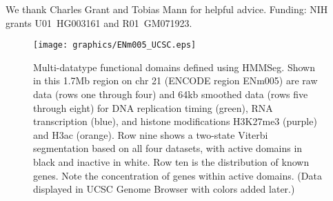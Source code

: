 \documentclass{bioinfo}
\begin{document}
We thank Charles Grant and Tobias Mann for helpful advice. Funding:
NIH grants U01~HG003161 and R01~GM071923.

\begin{figure}
  \centering
  \texttt{[image: graphics/ENm005\_UCSC.eps]}
  \caption{Multi-datatype functional domains defined using HMMSeg.
  Shown in this 1.7Mb region on chr 21 (ENCODE region ENm005) are raw
  data (rows one through four) and 64kb smoothed data (rows five
  through eight) for DNA replication timing (green), RNA transcription
  (blue), and histone modifications H3K27me3 (purple) and H3ac
  (orange).  Row nine shows a two-state Viterbi segmentation based on
  all four datasets, with active domains in black and inactive in
  white. Row ten is the distribution of known genes. Note the
  concentration of genes within active domains. (Data displayed in
  UCSC Genome Browser with colors added later.)}
  \label{ucsc}
\end{figure}


\end{document}
